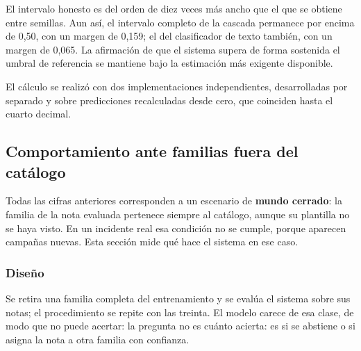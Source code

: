 \begin{table}[ht]
\centering
\caption{Intervalos de confianza del 95\% según la fuente de incertidumbre (149 notas, P2bal)}
\label{tab:ic_plantilla}
\end{table}

El intervalo honesto es del orden de diez veces más ancho que el que se obtiene entre semillas. Aun así, el intervalo completo de la cascada permanece por encima de 0,50, con un margen de 0,159; el del clasificador de texto también, con un margen de 0,065. La afirmación de que el sistema supera de forma sostenida el umbral de referencia se mantiene bajo la estimación más exigente disponible.

El cálculo se realizó con dos implementaciones independientes, desarrolladas por separado y sobre predicciones recalculadas desde cero, que coinciden hasta el cuarto decimal.


\subsection{Comportamiento ante familias fuera del catálogo}
\label{subsec:res_mundo_abierto}

Todas las cifras anteriores corresponden a un escenario de \textbf{mundo cerrado}: la familia de la nota evaluada pertenece siempre al catálogo, aunque su plantilla no se haya visto. En un incidente real esa condición no se cumple, porque aparecen campañas nuevas. Esta sección mide qué hace el sistema en ese caso.

\subsubsection*{Diseño}

Se retira una familia completa del entrenamiento y se evalúa el sistema sobre sus notas; el procedimiento se repite con las treinta. El modelo carece de esa clase, de modo que no puede acertar: la pregunta no es cuánto acierta: es si se abstiene o si asigna la nota a otra familia con confianza.

